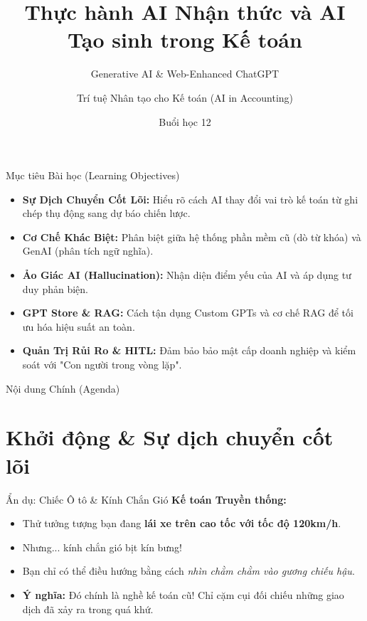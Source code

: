 \documentclass[aspectratio=169,12pt]{beamer}
\title[AI trong Kế toán - Buổi 12]{Thực hành AI Nhận thức và AI Tạo sinh trong Kế toán}
\subtitle{Generative AI \& Web-Enhanced ChatGPT}
\author[Giảng viên]{Trí tuệ Nhân tạo cho Kế toán (AI in Accounting)}
\institute[Đại học]{Khoa Kế toán - Kiểm toán}
\date{Buổi học 12}
\begin{document}
\begin{frame}
    \titlepage
\end{frame}

\begin{frame}{Mục tiêu Bài học (Learning Objectives)}
    \begin{itemize}
        \item \textbf{Sự Dịch Chuyển Cốt Lõi:} Hiểu rõ cách AI thay đổi vai trò kế toán từ ghi chép thụ động sang dự báo chiến lược.
        \item \textbf{Cơ Chế Khác Biệt:} Phân biệt giữa hệ thống phần mềm cũ (dò từ khóa) và GenAI (phân tích ngữ nghĩa).
        \item \textbf{Ảo Giác AI (Hallucination):} Nhận diện điểm yếu của AI và áp dụng tư duy phản biện.
        \item \textbf{GPT Store \& RAG:} Cách tận dụng Custom GPTs và cơ chế RAG để tối ưu hóa hiệu suất an toàn.
        \item \textbf{Quản Trị Rủi Ro \& HITL:} Đảm bảo bảo mật cấp doanh nghiệp và kiểm soát với "Con người trong vòng lặp".
    \end{itemize}
\end{frame}

\begin{frame}{Nội dung Chính (Agenda)}
    \tableofcontents
\end{frame}

\section{Khởi động \& Sự dịch chuyển cốt lõi}
\begin{frame}
    \tableofcontents[currentsection]
\end{frame}

\begin{frame}{Ẩn dụ: Chiếc Ô tô \& Kính Chắn Gió}
    \textbf{Kế toán Truyền thống:}
    \begin{itemize}
        \item Thử tưởng tượng bạn đang \textbf{lái xe trên cao tốc với tốc độ 120km/h}.
        \item Nhưng... kính chắn gió bịt kín bưng! 
        \item Bạn chỉ có thể điều hướng bằng cách \textit{nhìn chằm chằm vào gương chiếu hậu}.
        \item \textbf{Ý nghĩa:} Đó chính là nghề kế toán cũ! Chỉ cặm cụi đối chiếu những giao dịch đã xảy ra trong quá khứ.
    \end{itemize}
\end{frame}
\end{document}
